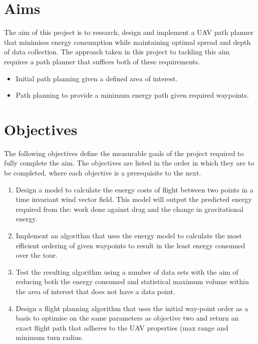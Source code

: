 \section{Aims}
The aim of this project is to research, design and implement a UAV path planner that minimises energy consumption while maintaining optimal spread and depth of data collection. The approach taken in this project to tackling this aim requires a path planner that suffices both of these requirements.
\begin{itemize}
\item  Initial path planning given a defined area of interest.
\item Path planning to provide a minimum energy path given required waypoints.
\end{itemize}

\section{Objectives}
The following objectives define the measurable goals of the project required to fully complete the aim. The objectives are listed in the order in which they are to be completed, where each objective is a prerequisite to the next.
\begin{enumerate}
\item Design a model to calculate the energy costs of flight between two points in a time invariant wind vector field. This model will output the predicted energy required from the: work done against drag and the change in gravitational energy.
\item Implement an algorithm that uses the energy model to calculate the most efficient ordering of given waypoints to result in the least energy consumed over the tour. 
\item Test the resulting algorithm using a number of data sets with the aim of reducing both the energy consumed and statistical maximum volume within the area of interest that does not have a data point.
\item Design a flight planning algorithm that uses the initial way-point order as a basis to optimise on the same parameters as objective two and return an exact flight path that adheres to the UAV properties (max range and minimum turn radius.  
\end{enumerate}

